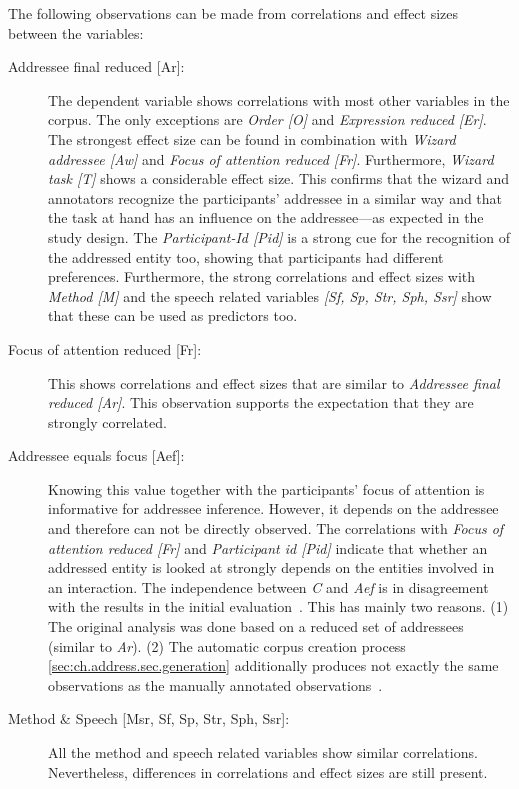 The following observations can be made from correlations and effect sizes between the variables:
\begin{description}
    \item[{Addressee final reduced [Ar]:}] The dependent variable shows correlations with most other variables in the corpus.
    The only exceptions are \emph{Order [O]} and \emph{Expression reduced [Er]}.
    The strongest effect size can be found in combination with \emph{Wizard \gls{addressee} [Aw]} and \emph{Focus of attention reduced [Fr]}.
    Furthermore, \emph{Wizard task [T]} shows a considerable effect size.
    This confirms that the \gls{wizard} and annotators recognize the participants' \gls{addressee} in a similar way and that the task at hand has an influence on the \gls{addressee}---as expected in the study design.
    The \emph{Participant-Id [Pid]} is a strong cue for the recognition of the addressed entity too, showing that participants had different preferences.
    Furthermore, the strong correlations and effect sizes with \emph{Method [M]} and the speech related variables \emph{[Sf, Sp, Str, Sph, Ssr]} show that these can be used as predictors too.
    \item[{Focus of attention reduced [Fr]:}] This shows correlations and effect sizes that are similar to \emph{Addressee final reduced [Ar]}.
    This observation supports the expectation that they are strongly correlated.
    \item[{Addressee equals focus [Aef]:}] Knowing this value together with the participants' focus of attention is informative for \gls{addressee} inference.
    However, it depends on the \gls{addressee} and therefore can not be directly observed.
    The correlations with \emph{Focus of attention reduced [Fr]} and \emph{Participant id [Pid]} indicate that whether an addressed entity is looked at strongly depends on the entities involved in an interaction.
    The independence between \emph{C} and \emph{Aef} is in disagreement with the results in the initial evaluation~\cite{Richter2016}.
    This has mainly two reasons.
    (1) The original analysis was done based on a reduced set of \glspl{addressee} (similar to \emph{Ar}).
    (2) The automatic corpus creation process \ref{sec:ch.address.sec.generation} additionally produces not exactly the same observations as the manually annotated observations~\cite{Richter2016}.
    \item[{Method \& Speech [Msr, Sf, Sp, Str, Sph, Ssr]:}] All the method and speech related variables show similar correlations. 
    Nevertheless, differences in correlations and effect sizes are still present.

\end{description}
